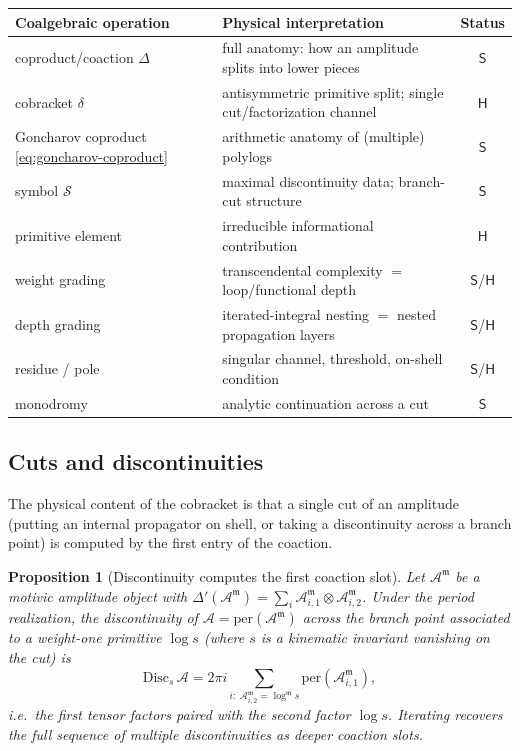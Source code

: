 \documentclass[12pt]{article}
\newtheorem{proposition}[theorem]{Proposition}
\theoremstyle{definition}
\theoremstyle{remark}
\newcommand{\per}{\mathrm{per}}
\newcommand{\Am}{\mathcal{A}}
\newcommand{\Amm}{\mathcal{A}^{\mathfrak{m}}}
\newcommand{\coA}{\Delta}
\newcommand{\cobr}{\delta}
\newcommand{\Slab}{\ensuremath{\mathsf{S}}}
\newcommand{\Hlab}{\ensuremath{\mathsf{H}}}
\begin{document}
\begin{statusbox}
\begin{center}
\small
\begin{tabular}{@{}L{0.34\textwidth} L{0.44\textwidth} c@{}}
\toprule
\textbf{Coalgebraic operation} & \textbf{Physical interpretation} & \textbf{Status} \\
\midrule
coproduct/coaction $\coA$ & full anatomy: how an amplitude splits into lower pieces & \Slab \\
cobracket $\cobr$ & antisymmetric primitive split; single cut/factorization channel & \Hlab \\
Goncharov coproduct \eqref{eq:goncharov-coproduct} & arithmetic anatomy of (multiple) polylogs & \Slab \\
symbol $\mathcal{S}$ & maximal discontinuity data; branch-cut structure & \Slab \\
primitive element & irreducible informational contribution & \Hlab \\
weight grading & transcendental complexity $=$ loop/functional depth & \Slab/\Hlab \\
depth grading & iterated-integral nesting $=$ nested propagation layers & \Slab/\Hlab \\
residue / pole & singular channel, threshold, on-shell condition & \Slab/\Hlab \\
monodromy & analytic continuation across a cut & \Slab \\
\bottomrule
\end{tabular}
\end{center}
\end{statusbox}

\subsection{Cuts and discontinuities}

The physical content of the cobracket is that a single cut of an amplitude (putting an
internal propagator on shell, or taking a discontinuity across a branch point) is
computed by the first entry of the coaction.

\begin{proposition}[Discontinuity computes the first coaction slot]
\label{prop:disc}
Let $\Amm$ be a motivic amplitude object with $\coA'(\Amm)=\sum_i\Amm_{i,1}\otimes\Amm_{i,2}$.
Under the period realization, the discontinuity of $\Am=\per(\Amm)$ across the branch point
associated to a weight-one primitive $\log s$ (where $s$ is a kinematic invariant vanishing
on the cut) is
\[
\mathrm{Disc}_s\,\Am = 2\pi i\sum_{i:\ \Amm_{i,2}=\log^{\mathfrak m} s}\per(\Amm_{i,1}),
\]
i.e.\ the first tensor factors paired with the second factor $\log s$. Iterating recovers
the full sequence of multiple discontinuities as deeper coaction slots.
\end{proposition}
\end{document}

